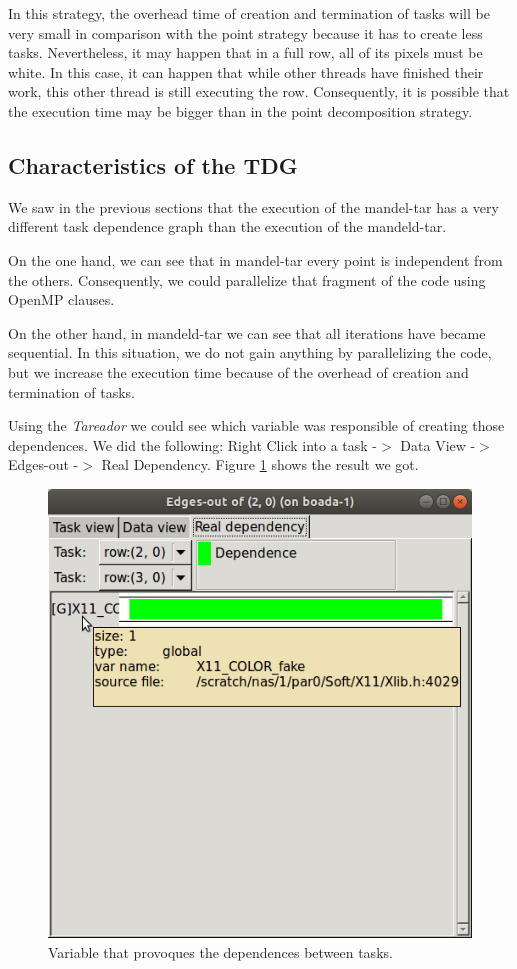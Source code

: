 \documentclass[12pt, a4paper]{article}
\begin{document}
In this strategy, the overhead time of creation and termination of tasks will be very small in comparison with the point strategy because it has to create less tasks. Nevertheless, it may happen that in a full row, all of its pixels must be white. In this case, it can happen that while other threads have finished their work, this other thread is still executing the row. Consequently, it is possible that the execution time may be bigger than in the point decomposition strategy.

\subsection{Characteristics of the TDG}

We saw in the previous sections that the execution of the mandel-tar has a very different task dependence graph than the execution of the mandeld-tar.

On the one hand, we can see that in mandel-tar every point is independent from the others. Consequently, we could parallelize that fragment of the code using OpenMP clauses.

On the other hand, in mandeld-tar we can see that all iterations have became sequential. In this situation, we do not gain anything by parallelizing the code, but we increase the execution time because of the overhead of creation and termination of tasks.

Using the \textit{Tareador} we could see which variable was responsible of creating those dependences. We did the following: Right Click into a task -$>$ Data View -$>$ Edges-out -$>$ Real Dependency. Figure \ref{fig:dependence_X11_COLOR_fake} shows the result we got.

\begin{figure}[H]
	\centering
	\includegraphics[scale=0.40]{./dependence_X11_COLOR_fake}
	\caption{Variable that provoques the dependences between tasks.}
	\label{fig:dependence_X11_COLOR_fake}
\end{figure}
\end{document}
